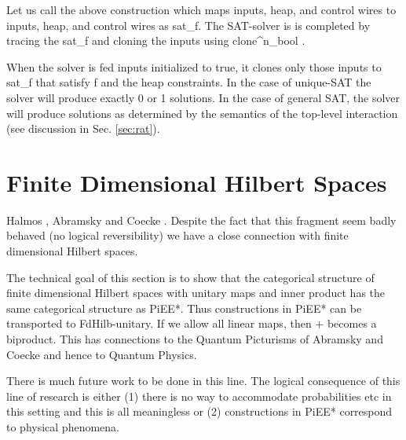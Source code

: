 \documentclass[preprint]{sigplanconf}
\newcommand{\xcomment}[2]{\textbf{#1:~\textsl{#2}}}
\newcommand{\roshan}[1]{\xcomment{Roshan}{#1}}
\begin{document}

Let us call the above construction which maps inputs, heap, and
control wires to inputs, heap, and control wires as {{sat_f}}. The
SAT-solver is is completed by tracing the {{sat_f}} and cloning the
inputs using {{clone^n_{bool} }}.

\begin{center}
\end{center}

When the solver is fed inputs initialized to {{true}}, it clones only
those inputs to {{sat_f}} that satisfy {{f}} and the heap
constraints. In the case of unique-SAT the solver will produce exactly
0 or 1 solutions. In the case of general SAT, the solver will produce
solutions as determined by the semantics of the top-level interaction
(see discussion in Sec. \ref{sec:rat}).


\section{Finite Dimensional Hilbert Spaces}



Halmos \cite{halmos1958finite}, Abramsky and Coecke
\cite{abramsky2004categorical}. Despite the fact that this fragment
seem badly behaved (no logical reversibility) we have a close
connection with finite dimensional Hilbert spaces.

The technical goal of this section is to show that the categorical
structure of finite dimensional Hilbert spaces with unitary maps and
inner product has the same categorical structure as {{PiEE*}}. Thus
constructions in {{PiEE*}} can be transported to FdHilb-unitary. If we
allow all linear maps, then {{+}} becomes a biproduct.  This has
connections to the Quantum Picturisms of Abramsky and Coecke and hence
to Quantum Physics.


There is much future work to be done in this line. The logical
consequence of this line of research is either (1) there is no way to
accommodate probabilities etc in this setting and this is all
meaningless or (2) constructions in {{PiEE*}} correspond to physical
phenomena.
\end{document}
